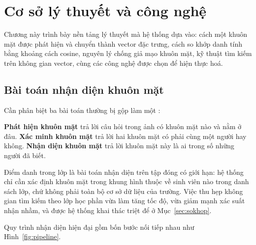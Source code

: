\chapter{Cơ sở lý thuyết và công nghệ}
\label{ch:coso}

\begin{muctieu}
Chương này trình bày nền tảng lý thuyết mà hệ thống dựa vào: cách một khuôn
mặt được phát hiện và chuyển thành vector đặc trưng, cách so khớp danh tính
bằng khoảng cách cosine, nguyên lý chống giả mạo khuôn mặt, kỹ thuật tìm
kiếm trên không gian vector, cùng các công nghệ được chọn để hiện thực hoá.
\end{muctieu}

\section{Bài toán nhận diện khuôn mặt}

Cần phân biệt ba bài toán thường bị gộp làm một \cite{Jain2004Biometric, Wang2021Survey}:

\begin{dinhnghia}
\textbf{Phát hiện khuôn mặt}  trả lời câu hỏi trong ảnh
có khuôn mặt nào và nằm ở đâu. \textbf{Xác minh khuôn mặt}  trả lời hai khuôn mặt có phải cùng một người hay không.
\textbf{Nhận diện khuôn mặt}  trả
lời khuôn mặt này là ai trong số những người đã biết.
\end{dinhnghia}

Điểm danh trong lớp là bài toán nhận diện trên tập đóng có giới hạn: hệ thống
chỉ cần xác định khuôn mặt trong khung hình thuộc về sinh viên nào trong danh
sách lớp, chứ không phải toàn bộ cơ sở dữ liệu của trường. Việc thu hẹp
không gian tìm kiếm theo lớp học phần vừa làm tăng tốc độ, vừa giảm mạnh xác
suất nhận nhầm, và được hệ thống khai thác triệt để ở Mục~\ref{sec:sokhop}.

Quy trình nhận diện hiện đại gồm bốn bước nối tiếp nhau \cite{Wang2021Survey} như Hình~\ref{fig:pipeline}.

